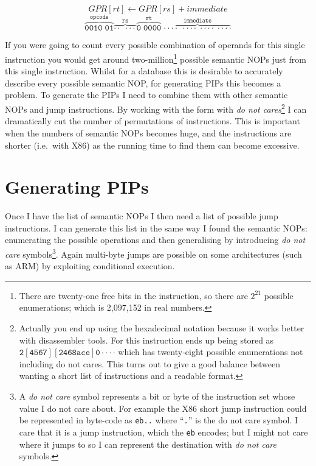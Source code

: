 \documentclass[10pt,]{book}
\begin{document}
\[GPR[rt] \gets GPR[rs] + immediate\]
\[\mathtt{\overbrace{0010\;01}^\text{opcode}
\overbrace{\cdot\cdot\;\cdot\cdot\cdot}^\text{rs}
\overbrace{0\;0000}^\text{rt}\; \overbrace{\cdot\cdot\cdot\cdot\;
\cdot\cdot\cdot\cdot\; \cdot\cdot\cdot\cdot\;
\cdot\cdot\cdot\cdot}^\text{immediate}}\]

If you were going to count every possible combination of operands for
this single instruction you would get around two-million\footnote{There
  are twenty-one free bits in the instruction, so there are $2^{21}$
  possible enumerations; which is 2,097,152 in real numbers.} possible
semantic NOPs just from this single instruction. Whilst for a database
this is desirable to accurately describe every possible semantic NOP,
for generating PIPs this becomes a problem. To generate the PIPs I need
to combine them with other semantic NOPs and jump instructions. By
working with the form with \emph{do not cares}\footnote{Actually you end
  up using the hexadecimal notation because it works better with
  disassembler tools. For this instruction ends up being stored as
  $\mathtt{2[4567][2468ace]0\cdot\cdot\cdot\cdot}$ which has
  twenty-eight possible enumerations not including do not cares. This
  turns out to give a good balance between wanting a short list of
  instructions and a readable format.} I can dramatically cut the number
of permutations of instructions. This is important when the numbers of
semantic NOPs becomes huge, and the instructions are shorter (i.e.~with
X86) as the running time to find them can become excessive.

\section{Generating PIPs}

Once I have the list of semantic NOPs I then need a list of possible
jump instructions. I can generate this list in the same way I found the
semantic NOPs: enumerating the possible operations and then generalising
by introducing \emph{do not care} symbols\footnote{A \emph{do not care}
  symbol represents a bit or byte of the instruction set whose value I
  do not care about. For example the X86 short jump instruction could be
  represented in byte-code as \lstinline!eb..! where ``\lstinline!.!''
  is the do not care symbol. I care that it is a jump instruction, which
  the \lstinline!eb! encodes; but I might not care where it jumps to so
  I can represent the destination with \emph{do not care} symbols.}.
Again multi-byte jumps are possible on some architectures (such as ARM)
by exploiting conditional execution.
\end{document}
